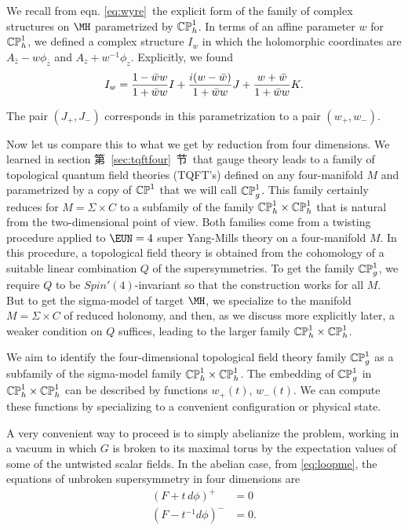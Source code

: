 We recall from eqn. \eqref{eq:wyre}\ the explicit form of the family of
complex structures on $\MH$ parametrized by $\Bbb{CP}_h^1$.  In
terms of an affine parameter $w$ for $\Bbb{CP}_h^1$, we defined a
complex structure $I_w$ in which the holomorphic coordinates are
$A_{\bar z}-w\phi_{\bar z}$ and $A_z+w^{-1}\phi_z$. Explicitly, we
found %
\setcounter{equation}{6}
\begin{equation}\label{eq:wyrre}
I_w={1-\bar w w\over 1+\bar w w}I+{i(w-\bar
w)\over 1+\bar w w}J+{w+\bar w\over 1+\bar w w}K.
\end{equation}

 The pair
$(J_+,J_-)$ corresponds in this parametrization to a pair
$(w_+,w_-)$.

\par{}

Now let us compare this to what we get by reduction from four
dimensions.  We learned in section 第~\ref{sec:tqftfour}~节\ that gauge theory
leads to a family of topological quantum field theories (TQFT's)
defined on any four-manifold $M$ and parametrized by a copy of
$\Bbb{CP}^1$ that we will call $\Bbb{CP}^1_g$.   This family
certainly reduces for $M=\Sigma\times C$ to a subfamily of the
family $\Bbb{CP}_h^1\times \Bbb{CP}_h^1$ that is natural from the
two-dimensional point of view. Both families come from a twisting
procedure applied to ${\EUN}=4$ super Yang-Mills theory on a
four-manifold $M$. In this procedure, a topological field theory
is obtained from the cohomology of a suitable linear combination
$Q$ of the supersymmetries.  To get the family $\Bbb{CP}^1_g$, we
require $Q$ to be $Spin'(4)$-invariant so that the construction
works for all $M$. But to get the sigma-model of target $\MH$, we
specialize to the manifold $M=\Sigma\times C$ of reduced holonomy,
and then, as we discuss more explicitly later, a weaker condition
on $Q$ suffices, leading to the larger family $\Bbb{CP}_h^1\times
\Bbb{CP}_h^1$.

We aim to identify the four-dimensional topological field theory
family $\Bbb{CP}^1_g$ as a subfamily of the sigma-model family
$\Bbb{CP}_h^1\times \Bbb{CP}_h^1$. The embedding of $\Bbb{CP}^1_g$
in $\Bbb{CP}_h^1\times \Bbb{CP}_h^1$ can be described by functions
$w_+(t)$, $w_-(t)$. We can compute these functions by specializing
to a convenient configuration or physical state.

A very convenient way to proceed is to simply abelianize the
problem, working in a vacuum in which $G$ is broken to its maximal
torus by the expectation values of some of the untwisted scalar
fields.   In the abelian case, from \eqref{eq:loopme}, the equations of
unbroken supersymmetry in four dimensions are
\setcounter{equation}{7}
\begin{equation}\label{eq:onso}
\begin{aligned}(F+t\,d\phi)^+&=0\\(F-t^{-1}d\phi)^-&=0.\\\end{aligned}
\end{equation}

